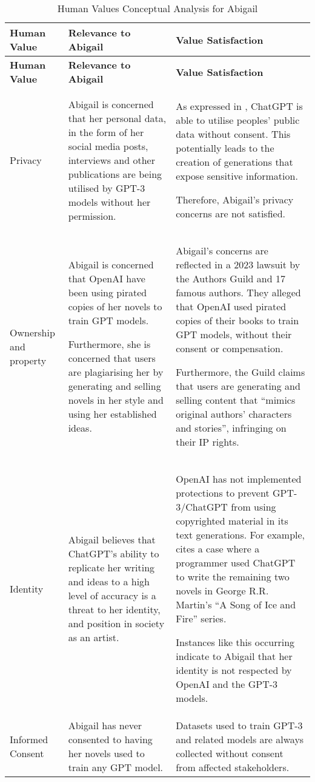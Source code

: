 \begin{longtable}{|p{}|p{}|p{}|}
\caption{Human Values Conceptual Analysis for Abigail} \label{tab:Abigail} \\
\hline
\textbf{Human Value} & \textbf{Relevance to Abigail} & \textbf{Value Satisfaction} \\
\hline
\endfirsthead

\hline
\textbf{Human Value} & \textbf{Relevance to Abigail} & \textbf{Value Satisfaction} \\
\hline
\endhead

\hline
\endfoot

\hline
\endlastfoot

Privacy & Abigail is concerned that her personal data, in the form of her social media posts, interviews and other publications are being utilised by GPT-3 models without her permission. & As expressed in \parencite{alkamli_2024_understanding}, ChatGPT is able to utilise peoples’ public data without consent. This potentially leads to the creation of generations that expose sensitive information.

Therefore, Abigail’s privacy concerns are not satisfied.\\
\hline
Ownership and property &Abigail is concerned that OpenAI have been using pirated copies of her novels to train GPT models.

Furthermore, she is concerned that users are plagiarising her by generating and selling novels in her style and using her established ideas.
& Abigail’s concerns are reflected in a 2023 lawsuit by the Authors Guild and 17 famous authors. They alleged that OpenAI used pirated copies of their books to train GPT models, without their consent or compensation. \parencite{authorsguild_2023_classaction}

Furthermore, the Guild claims that users are generating and selling content that “mimics original authors’ characters and stories”, infringing on their IP rights.
\\
\hline
Identity &Abigail believes that ChatGPT’s ability to replicate her writing and ideas to a high level of accuracy is a threat to her identity, and position in society as an artist.& OpenAI has not implemented protections to prevent GPT-3/ChatGPT from using copyrighted material in its text generations. For example, \textcite{authorsguild_2023_classaction} cites a case where a programmer used ChatGPT to write the remaining two novels in George R.R. Martin’s “A Song of Ice and Fire” series.

Instances like this occurring indicate to Abigail that her identity is not respected by OpenAI and the GPT-3 models.
\\
\hline
Informed Consent & Abigail has never consented to having her novels used to train any GPT model. &Datasets used to train GPT-3 and related models are always collected without consent from affected stakeholders.  \\
\hline

\end{longtable}

